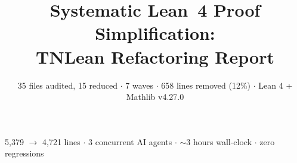 \documentclass[aspectratio=169,10pt]{beamer}
\title{\textbf{Systematic Lean~4 Proof Simplification:\\{}TNLean Refactoring Report}}
\subtitle{{\small 35 files audited, 15 reduced $\cdot$ 7 waves $\cdot$ 658 lines removed (12\%) $\cdot$ Lean 4 + Mathlib v4.27.0}}
\date{}
\author{}
\begin{document}
{%
\begin{frame}
    \vspace{-1.5em}
    \maketitle
    \vspace{-3em}
    \begin{center}
        {\footnotesize
            \textcolor{dimwhite}{5{,}379 $\to$ 4{,}721 lines $\cdot$
            3 concurrent AI agents $\cdot$
            ${\sim}$3 hours wall-clock $\cdot$
            zero regressions}}
    \end{center}
\end{frame}
}

\end{document}

